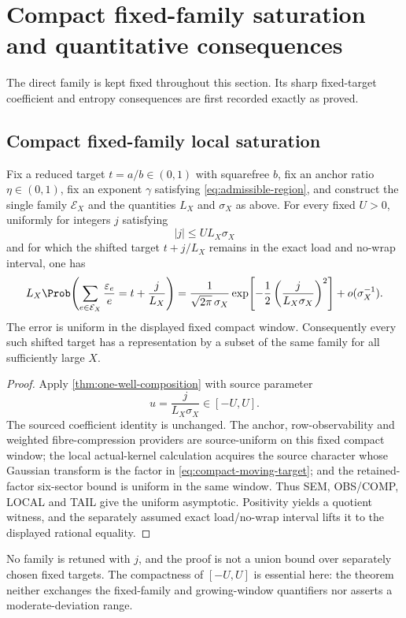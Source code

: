\section{Compact fixed-family saturation and quantitative consequences}
\label{sec:saturation-quantitative}

The direct family is kept fixed throughout this section.  Its sharp fixed-target coefficient and entropy consequences are first recorded exactly as proved.


\subsection{Compact fixed-family local saturation}

\begin{theorem}
\label{thm:compact-moving-target}
Fix a reduced target $t=a/b\in(0,1)$ with squarefree $b$, fix an anchor ratio $\eta\in(0,1)$, fix an exponent $\gamma$ satisfying \cref{eq:admissible-region}, and construct the single family $\mathcal E_X$ and the quantities $L_X$ and $\sigma_X$ as above.  For every fixed $U>0$, uniformly for integers $j$ satisfying
\[
 |j|\leq U L_X\sigma_X
\]
and for which the shifted target $t+j/L_X$ remains in the exact load and no-wrap interval, one has
\begin{equation}
\label{eq:compact-moving-target}
 L_X\Prob\!\left(
   \sum_{e\in\mathcal E_X}\frac{\varepsilon_e}{e}
   =t+\frac{j}{L_X}
 \right)
 =\frac{1}{\sqrt{2\pi}\,\sigma_X}
   \exp\!\left[-\frac12
     \left(\frac{j}{L_X\sigma_X}\right)^2\right]
  +o(\sigma_X^{-1}).
\end{equation}
The error is uniform in the displayed fixed compact window.  Consequently every such shifted target has a representation by a subset of the same family for all sufficiently large $X$.
\end{theorem}

\begin{proof}
Apply \cref{thm:one-well-composition} with source parameter
\[
 u=\frac{j}{L_X\sigma_X}\in[-U,U].
\]
The sourced coefficient identity is unchanged.  The anchor, row-observability and weighted fibre-compression providers are source-uniform on this fixed compact window; the local actual-kernel calculation acquires the source character whose Gaussian transform is the factor in \cref{eq:compact-moving-target}; and the retained-factor six-sector bound is uniform in the same window.  Thus SEM, OBS/COMP, LOCAL and TAIL give the uniform asymptotic.  Positivity yields a quotient witness, and the separately assumed exact load/no-wrap interval lifts it to the displayed rational equality.
\end{proof}

No family is retuned with $j$, and the proof is not a union bound over separately chosen fixed targets.  The compactness of $[-U,U]$ is essential here: the theorem neither exchanges the fixed-family and growing-window quantifiers nor asserts a moderate-deviation range.


